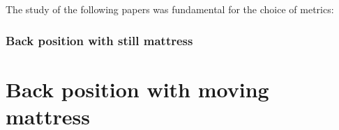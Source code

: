The study of the following papers was fundamental for the choice of metrics:


\clearpage

\subsubsection{Back position with still mattress}




\section{Back position with moving mattress}


\begin{comment}

















\end{comment}
